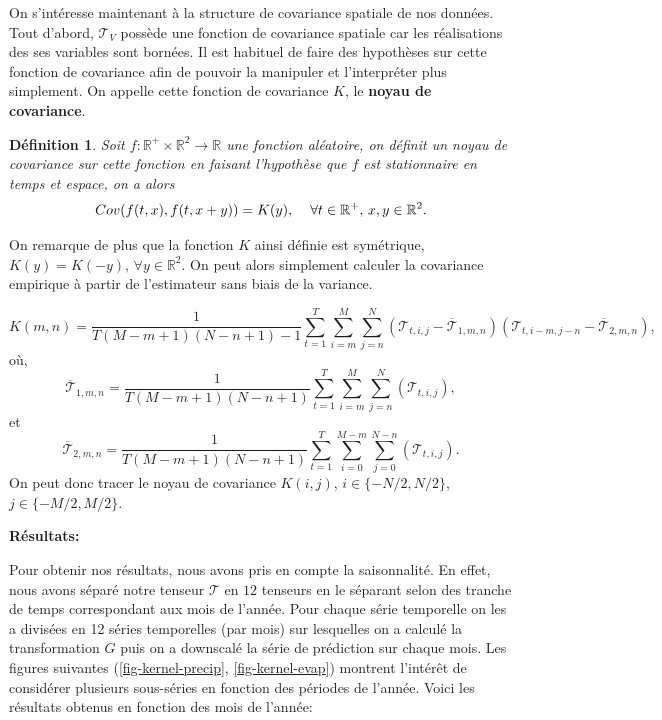 \documentclass[a4paper,11pt]{article}
\numberwithin{equation}{section}
\newtheorem{definition}{Définition}
\begin{document}
\vspace{0.7cm}

On s'intéresse maintenant à la structure de covariance spatiale de nos données. Tout d'abord, $\mathcal{T}_{V}$ possède une fonction de covariance spatiale car les réalisations des ses variables sont bornées. Il est habituel de faire des hypothèses sur cette fonction de covariance afin de pouvoir la manipuler et l'interpréter plus simplement. On appelle cette fonction de covariance $K$, le \textbf{noyau de covariance}.

\begin{definition}
	Soit $f:\mathbb{R}^{+}\times\mathbb{R}^2\to \mathbb{R}$ une fonction aléatoire, on définit un noyau de covariance sur cette fonction en faisant l'hypothèse que $f$ est stationnaire en temps et espace, on a alors
	\[Cov(f(t,x),f(t,x+y))=K(y), \hspace{4mm} \forall t \in \mathbb{R}^{+},\,x,y \in \mathbb{R}^2. \] 
\end{definition}

On remarque de plus que la fonction $K$ ainsi définie est symétrique, $K(y)=K(-y),\, \forall y \in \mathbb{R}^2$. On peut alors simplement calculer la covariance empirique à partir de l'estimateur sans biais de la variance.

\[K(m,n)=\frac{1}{T(M-m+1)(N-n+1)-1}\sum_{t=1}^{T}\sum_{i=m}^{M}\sum_{j=n}^{N}(\mathcal{T}_{t,i,j}-\overline{\mathcal{T}}_{1,m,n})(\mathcal{T}_{t,i-m,j-n}-\overline{\mathcal{T}}_{2,m,n}),\]
où,
\[\overline{\mathcal{T}}_{1,m,n}=\frac{1}{T(M-m+1)(N-n+1)}\sum_{t=1}^{T}\sum_{i=m}^{M}\sum_{j=n}^{N}(\mathcal{T}_{t,i,j}),\]
et 
\[\overline{\mathcal{T}}_{2,m,n}=\frac{1}{T(M-m+1)(N-n+1)}\sum_{t=1}^{T}\sum_{i=0}^{M-m}\sum_{j=0}^{N-n}(\mathcal{T}_{t,i,j}).\]
On peut donc tracer le noyau de covariance $K(i,j)$, $i \in\{-N/2,N/2\}$, $j \in \{-M/2,M/2\}$. 

\vspace{0.7cm}

\noindent \textbf{Résultats:}

Pour obtenir nos résultats, nous avons pris en compte la saisonnalité. En effet, nous avons séparé notre tenseur $\mathcal{T}$ en $12$ tenseurs en le séparant selon des tranche de temps correspondant aux mois de l'année. Pour chaque série temporelle on les a divisées en 12 séries temporelles (par mois) sur lesquelles on a calculé la transformation $G$ puis on a downscalé la série de prédiction sur chaque mois. Les figures suivantes (\ref{fig-kernel-precip}, \ref{fig-kernel-evap}) montrent l'intérêt de considérer plusieurs sous-séries en fonction des périodes de l'année. 
Voici les résultats obtenus en fonction des mois de l'année:
\end{document}
